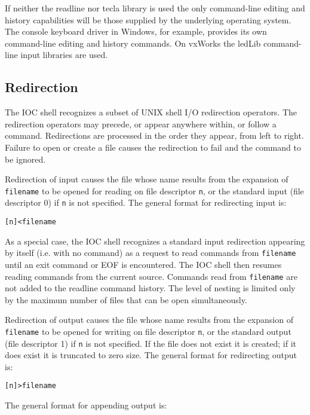 If neither the readline nor tecla library is used the only command-line editing and history capabilities will be those 
supplied by the underlying operating system.  The console keyboard driver in Windows, for example, provides its own 
command-line editing and history commands.  On vxWorks the ledLib command-line input libraries are used.

\subsection{Redirection}

The IOC shell recognizes a subset of UNIX shell I/O redirection operators.  The redirection operators may precede, or 
appear anywhere within, or follow a command.  Redirections are processed in the order they appear, from left to right.   
Failure to open or create a file causes the redirection to fail and the command to be ignored.

Redirection of input causes the file whose name results from the  expansion  of  \verb|filename|  to  be  opened for reading on 
file descriptor \verb|n|, or the standard input (file descriptor 0) if \verb|n| is not specified.  The general format for redirecting input is:

\begin{verbatim}
[n]<filename
\end{verbatim}

As a special case, the IOC shell recognizes a standard input redirection appearing by itself (i.e. with no command) as a 
request to read commands from \verb|filename| until an exit command or EOF is encountered. The IOC shell then resumes 
reading commands from the current source. Commands read from \verb|filename| are not added to the readline command 
history. The level of nesting is limited only by the maximum number of files that can be open simultaneously.

Redirection of output causes the  file  whose  name  results from  the expansion of \verb|filename| to be opened for writing on 
file descriptor \verb|n|, or the standard output (file descriptor 1)  if \verb|n|  is  not  specified.   If  the  file  does not exist it is created; 
if it does exist it is truncated to zero size. The general format for redirecting output is:

\begin{verbatim}
[n]>filename
\end{verbatim}

 The general format for appending output is:


